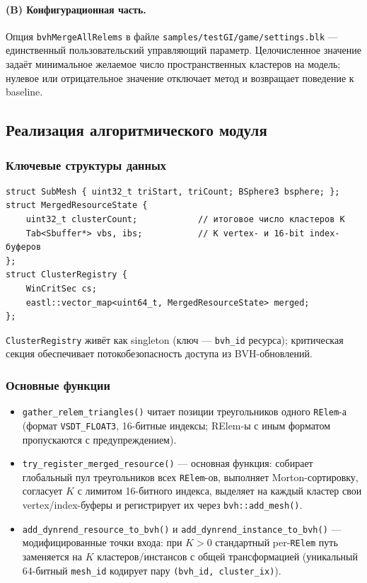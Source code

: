 \paragraph{(B) Конфигурационная часть.} Опция
\texttt{bvhMergeAllRelems} в файле
\texttt{samples/testGI/game/settings.blk} --- единственный
пользовательский управляющий параметр. Целочисленное значение
задаёт минимальное желаемое число пространственных кластеров на
модель; нулевое или отрицательное значение отключает метод и
возвращает поведение к baseline.

\subsection{Реализация алгоритмического модуля}

\subsubsection{Ключевые структуры данных}

\begin{verbatim}
struct SubMesh { uint32_t triStart, triCount; BSphere3 bsphere; };
struct MergedResourceState {
    uint32_t clusterCount;            // итоговое число кластеров K
    Tab<Sbuffer*> vbs, ibs;           // K vertex- и 16-bit index-буферов
};
struct ClusterRegistry {
    WinCritSec cs;
    eastl::vector_map<uint64_t, MergedResourceState> merged;
};
\end{verbatim}

\texttt{ClusterRegistry} живёт как singleton (ключ --- \texttt{bvh\_id}
ресурса); критическая секция обеспечивает потокобезопасность доступа
из BVH-обновлений.

\subsubsection{Основные функции}

\begin{itemize}
\item \texttt{gather\_relem\_triangles()} читает позиции
  треугольников одного \texttt{RElem}-а (формат \texttt{VSDT\_FLOAT3},
  16-битные индексы; RElem-ы с иным форматом пропускаются с
  предупреждением).
\item \texttt{try\_register\_merged\_resource()} --- основная
  функция: собирает глобальный пул треугольников всех \texttt{RElem}-ов,
  выполняет Morton-сортировку, согласует $K$ с лимитом 16-битного
  индекса, выделяет на каждый кластер свои vertex/index-буферы и
  регистрирует их через \texttt{bvh::add\_mesh()}.
\item \texttt{add\_dynrend\_resource\_to\_bvh()} и
  \texttt{add\_dynrend\_instance\_to\_bvh()} --- модифицированные
  точки входа: при $K\!>\!0$ стандартный per-\texttt{RElem} путь
  заменяется на $K$ кластеров/инстансов с общей трансформацией
  (уникальный 64-битный \texttt{mesh\_id} кодирует пару
  \texttt{(bvh\_id, cluster\_ix)}).
\end{itemize}

